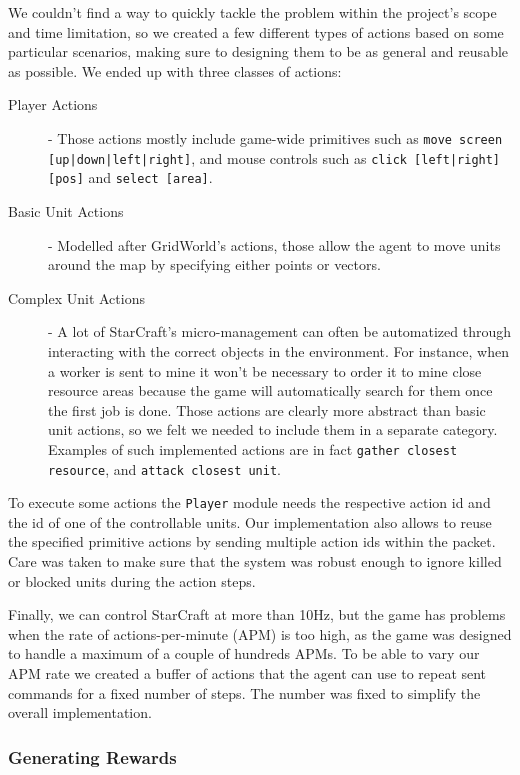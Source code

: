 We couldn't find a way to quickly tackle the problem within the project's scope
and time limitation, so we created a few different types of actions based on
some particular scenarios, making sure to designing them to be as general and
reusable as possible. We ended up with three classes of actions:

\begin{description}
\item [Player Actions] - Those actions mostly include game-wide primitives such
  as \texttt{move screen [up|down|left|right]}, and mouse controls such as
  \texttt{click [left|right][pos]} and \texttt{select [area]}.
\item [Basic Unit Actions] - Modelled after GridWorld's actions, those allow the
  agent to move units around the map by specifying either points or vectors.
\item [Complex Unit Actions] - A lot of StarCraft's micro-management can often
  be automatized through interacting with the correct objects in the
  environment. For instance, when a worker is sent to mine it won't be necessary
  to order it to mine close resource areas because the game will automatically
  search for them once the first job is done. Those actions are clearly more
  abstract than basic unit actions, so we felt we needed to include them in a
  separate category. Examples of such implemented actions are in fact
  \texttt{gather closest resource}, and \texttt{attack closest unit}.
\end{description}

To execute some actions the \texttt{Player} module needs the respective action
id and the id of one of the controllable units. Our implementation also allows
to reuse the specified primitive actions by sending multiple action ids within
the packet.
Care was taken to make sure that the system was robust enough to ignore killed
or blocked units during the action steps. 

Finally, we can control StarCraft at more than 10Hz, but the game has problems
when the rate of actions-per-minute (APM) is too high, as the game was designed
to handle a maximum of a couple of hundreds APMs. To be able to vary our APM
rate we created a buffer of actions that the agent can use to repeat sent
commands for a fixed number of steps. The number was fixed to simplify the
overall implementation.


\subsubsection{Generating Rewards}

